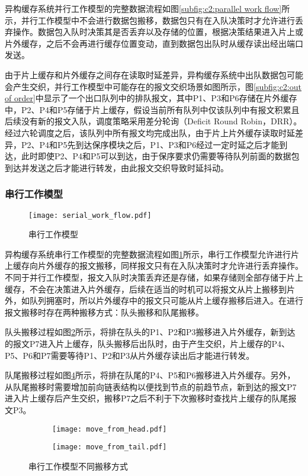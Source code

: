 异构缓存系统并行工作模型的完整数据流程如图\ref{subfig:c2:parallel work flow}所示，并行工作模型中不会进行数据包搬移，数据包只有在入队决策时才允许进行丢弃操作。数据包入队时决策其是否丢弃以及存储的位置，根据决策结果进入片上或片外缓存，之后不会再进行缓存位置变动，直到数据包出队时从缓存读出经出端口发送。

由于片上缓存和片外缓存之间存在读取时延差异，异构缓存系统中出队数据包可能会产生交织，并行工作模型中可能存在的报文交织场景如图所示，图\ref{subfig:c2:out of order}中显示了一个出口队列中的排队报文，其中P1、P3和P6存储在片外缓存中，P2、P4和P5存储于片上缓存，假设当前所有队列中仅该队列中有报文积累且后续没有新的报文入队，调度策略采用差分轮询（Deficit Round Robin，DRR）。经过六轮调度之后，该队列中所有报文均完成出队，由于片上片外缓存读取时延差异，P2、P4和P5先到达保序模块之后，P1、P3和P6经过一定时延之后才能到达，此时即使P2、P4和P5可以到达，由于保序要求仍需要等待队列前面的数据包到达并发送之后才能进行转发，由此报文交织导致时延抖动。

\subsubsection{串行工作模型}

\begin{figure}[H]
  \centering
  \texttt{[image: serial\_work\_flow.pdf]}
  \caption{串行工作模型}
  \label{fig:c2:serial work flow}
\end{figure}

异构缓存系统串行工作模型的完整数据流程如图\ref{fig:c2:serial work flow}所示，串行工作模型允许进行片上缓存向片外缓存的报文搬移，同样报文只有在入队决策时才允许进行丢弃操作。不同于并行工作模型，报文入队时决策丢弃还是存储，如果存储则全部存储于片上缓存，不会在决策进入片外缓存，后续在适当的时机可以将报文从片上搬移到片外，如队列拥塞时，所以片外缓存中的报文只可能从片上缓存搬移后进入。在进行报文搬移时存在两种搬移方式：队头搬移和队尾搬移。

队头搬移过程如图\ref{subfig:c2:move from head}所示，将排在队头的P1、P2和P3搬移进入片外缓存，新到达的报文P7进入片上缓存，队头搬移后出队时，由于产生交织，片上缓存的P4、P5、P6和P7需要等待P1、P2和P3从片外缓存读出后才能进行转发。

队尾搬移过程如图\ref{subfig:c2:move from tail}所示，将排在队尾的P4、P5和P6搬移进入片外缓存。另外，从队尾搬移时需要增加前向链表结构以便找到节点的前趋节点，新到达的报文P7进入片上缓存后产生交织，搬移P7之后不利于下次搬移时查找片上缓存的队尾报文P3。

\begin{figure}[H]
  \begin{subfigure}[b]{0.49\linewidth}
      \centering
      \texttt{[image: move\_from\_head.pdf]}
      \label{subfig:c2:move from head}
  \end{subfigure}
  \begin{subfigure}[b]{0.49\linewidth}
      \centering
      \texttt{[image: move\_from\_tail.pdf]}
      \label{subfig:c2:move from tail}
  \end{subfigure}
  \caption{串行工作模型不同搬移方式}
\end{figure}

